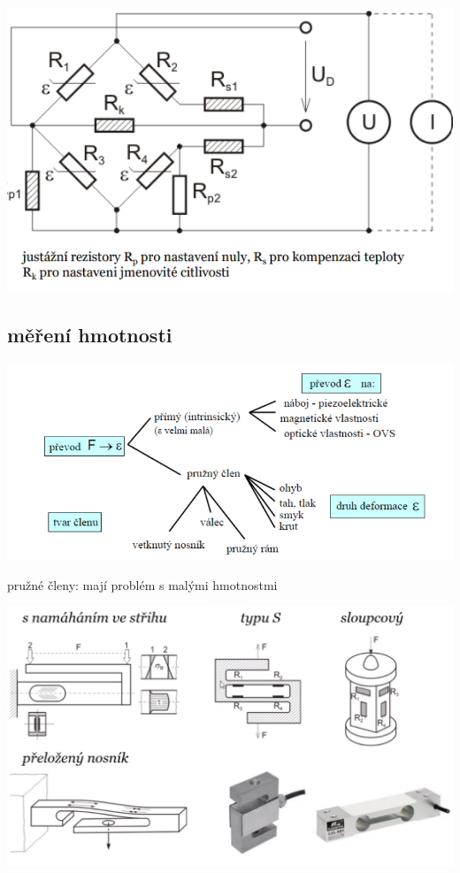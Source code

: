 \includegraphics*[scale= 0.8]{img/mustek_tenzometrovy.png}


\subsection*{měření hmotnosti}

\includegraphics*[scale= 0.8]{img/hmotnost.png}

pružné členy:
mají problém s malými hmotnostmi

\includegraphics*[scale= 0.2]{img/pruznyclen.png}

